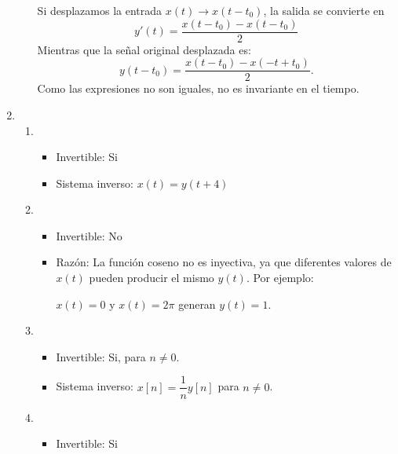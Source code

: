 \begin{enumerate}[label=\color{red}\textbf{\arabic*)}]
\begin{enumerate}[label=\color{red}\textbf{\alph*)}]
            Si desplazamos la entrada $x(t)\to x(t-t_0)$, la salida se convierte en \[
            y'(t)=\dfrac{x(t-t_0)-x(t-t_0)}{2}
            \] 
            Mientras que la señal original desplazada es: \[
            y(t-t_0)=\dfrac{x(t-t_0)-x(-t+t_0)}{2}.
            \] 
            Como las expresiones no son iguales, no es invariante en el tiempo.
    \end{enumerate}
\item {}
    \begin{enumerate}[label=\color{red}\textbf{\alph*)}]
        \item {} 
            \begin{itemize}[label=\textbullet]
                \item Invertible: Si
                \item Sistema inverso: $x(t)=y(t+4)$
            \end{itemize}
        \item {} 
            \begin{itemize}[label=\textbullet]
                \item Invertible: No
                \item Razón: La función coseno no es inyectiva, ya que diferentes valores de $x(t)$ pueden producir el mismo  $y(t)$. Por ejemplo: 
                    \begin{center}
                        $x(t)=0$ y  $x(t)=2\pi$ generan $y(t)=1$.
                    \end{center}
            \end{itemize}
        \item {} 
            \begin{itemize}[label=\textbullet]
                \item Invertible: Si, para $n\neq 0$.
                \item Sistema inverso: $x[n]=\dfrac{1}{n}y[n]$ para $n\neq 0$.
            \end{itemize}
        \item {} 
            \begin{itemize}[label=\textbullet]
                \item Invertible: Si

\end{itemize}
\end{enumerate}
\end{enumerate}
